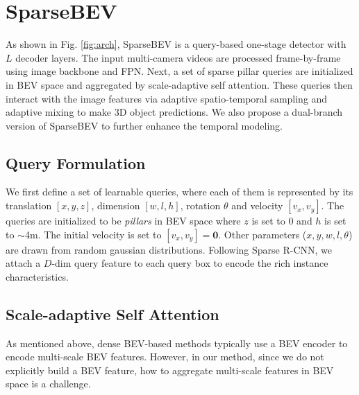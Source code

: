 \documentclass[10pt,twocolumn,letterpaper]{article}
\begin{document}
\section{SparseBEV}

As shown in Fig. \ref{fig:arch}, SparseBEV is a query-based one-stage detector with $L$ decoder layers. The input multi-camera videos are processed frame-by-frame using image backbone and FPN. Next, a set of sparse pillar queries are initialized in BEV space and aggregated by scale-adaptive self attention. These queries then interact with the image features via adaptive spatio-temporal sampling and adaptive mixing to make 3D object predictions. We also propose a dual-branch version of SparseBEV to further enhance the temporal modeling.

\subsection{Query Formulation}

We first define a set of learnable queries, where each of them is represented by its translation $[x, y, z]$, dimension $[w, l, h]$, rotation $\theta$ and velocity $[v_x, v_y]$. The queries are initialized to be \textit{pillars} in BEV space where $z$ is set to 0 and $h$ is set to $\sim$4m. The initial velocity is set to $[v_x, v_y] = \mathbf{0}$. Other parameters ($x, y, w, l, \theta$) are drawn from random gaussian distributions. Following Sparse R-CNN\cite{sparsercnn}, we attach a $D$-dim query feature to each query box to encode the rich instance characteristics.

\subsection{Scale-adaptive Self Attention}

As mentioned above, dense BEV-based methods typically use a BEV encoder to encode multi-scale BEV features. However, in our method, since we do not explicitly build a BEV feature, how to aggregate multi-scale features in BEV space is a challenge.
\end{document}
